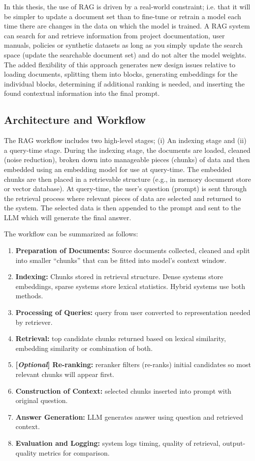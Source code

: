 In this thesis, the use of \ac{RAG} is driven by a real-world constraint; i.e. that it will be simpler to update a document set than to fine-tune or retrain a model each time there are changes in the data on which the model is trained. A \ac{RAG} system can search for and retrieve information from project documentation, user manuals, policies or synthetic datasets as long as you simply update the search space (update the searchable document set) and do not alter the model weights. The added flexibility of this approach generates new design issues relative to loading documents, splitting them into blocks, generating embeddings for the individual blocks, determining if additional ranking is needed, and inserting the found contextual information into the final prompt.

\subsection{Architecture and Workflow}

The \ac{RAG} workflow includes two high-level stages; (i) An indexing stage and (ii) a query-time stage. During the indexing stage, the documents are loaded, cleaned (noise reduction), broken down into manageable pieces (chunks) of data and then embedded using an embedding model for use at query-time. The embedded chunks are then placed in a retrievable structure (e.g., in memory document store or vector database). At query-time, the user's question (prompt) is sent through the retrieval process where relevant pieces of data are selected and returned to the system. The selected data is then appended to the prompt and sent to the \ac{LLM} which will generate the final answer.

The workflow can be summarized as follows:
\begin{enumerate}
    \item {\textbf{Preparation of Documents:}} Source documents collected, cleaned and split into smaller “chunks” that can be fitted into model’s context window.
    \item {\textbf{Indexing:}} Chunks stored in retrieval structure. Dense systems store embeddings, sparse systems store lexical statistics. Hybrid systems use both methods.
    \item {\textbf{Processing of Queries:}} query from user converted to representation needed by retriever.
    \item {\textbf{Retrieval:}} top candidate chunks returned based on lexical similarity, embedding similarity or combination of both.
    \item {\textbf{[\textit{Optional}] Re-ranking:}} reranker filters (re-ranks) initial candidates so most relevant chunks will appear first.
    \item {\textbf{Construction of Context:}} selected chunks inserted into prompt with original question.
    \item {\textbf{Answer Generation:}} \ac{LLM} generates answer using question and retrieved context.
    \item {\textbf{Evaluation and Logging:}} system logs timing, quality of retrieval, output-quality metrics for comparison.
\end{enumerate}

